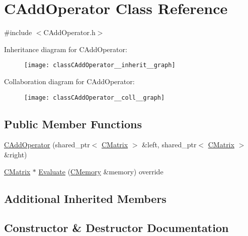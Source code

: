 \hypertarget{classCAddOperator}{}\section{C\+Add\+Operator Class Reference}
\label{classCAddOperator}


{\ttfamily \#include $<$C\+Add\+Operator.\+h$>$}



Inheritance diagram for C\+Add\+Operator\+:\nopagebreak
\begin{figure}[H]
\begin{center}
\leavevmode
\texttt{[image: classCAddOperator\_\_inherit\_\_graph]}
\end{center}
\end{figure}


Collaboration diagram for C\+Add\+Operator\+:\nopagebreak
\begin{figure}[H]
\begin{center}
\leavevmode
\texttt{[image: classCAddOperator\_\_coll\_\_graph]}
\end{center}
\end{figure}
\subsection*{Public Member Functions}
\begin{DoxyCompactItemize}
\item 
\hyperlink{classCAddOperator_aa8b0f16536813f81d9b957a66d540e81}{C\+Add\+Operator} (shared\+\_\+ptr$<$ \hyperlink{classCMatrix}{C\+Matrix} $>$ \&left, shared\+\_\+ptr$<$ \hyperlink{classCMatrix}{C\+Matrix} $>$ \&right)
\item 
\hyperlink{classCMatrix}{C\+Matrix} $\ast$ \hyperlink{classCAddOperator_a231aacd1eab97d55bb41bc05139420df}{Evaluate} (\hyperlink{classCMemory}{C\+Memory} \&memory) override
\end{DoxyCompactItemize}
\subsection*{Additional Inherited Members}


\subsection{Constructor \& Destructor Documentation}

